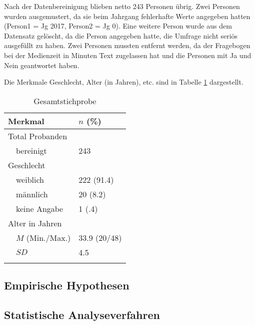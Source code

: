 Nach der Datenbereinigung blieben netto 243 Personen übrig. Zwei Personen wurden ausgemustert, da sie beim Jahrgang fehlerhafte Werte angegeben hatten (Person1 = Jg 2017, Person2 = Jg 0). Eine weitere Person wurde aus dem Datensatz gelöscht, da die Person angegeben hatte, die Umfrage nicht seriös ausgefüllt zu haben. Zwei Personen mussten entfernt werden, da der Fragebogen bei der Medienzeit in Minuten Text zugelassen hat und die Personen mit Ja und Nein geantwortet haben.

Die Merkmale Geschlecht, Alter (in Jahren), etc. sind in Tabelle \ref{table:Stichprobe} dargestellt.

\begin{table}[htbp]

\begin{tabular}{m{0.5em}  m{10em}  m{5em}} 
  \hline
  \multicolumn{2}{l}{\textbf{Merkmal}} & \textbf{$n$ (\%)} \\
  \hline
  \multicolumn{2}{l}{Total Probanden} \\
  & bereinigt & 243\\
  \multicolumn{2}{l}{Geschlecht} \\ 
   & weiblich & 222 (91.4)\\ 
   & männlich & 20 (8.2)\\ 
   & keine Angabe & 1 (.4)\\ 
   
  \multicolumn{2}{l}{Alter in Jahren} \\
  & $M$ (Min./Max.) & 33.9 (20/48) \\
  & $SD$ & 4.5 \\
   
  \hline
  &&\\
\end{tabular}
\caption{Gesamtstichprobe}
\label{table:Stichprobe}
\end{table}


\subsection{Empirische Hypothesen}\label{sec:EmpirischeHypothesen}
\subsection{Statistische Analyseverfahren}